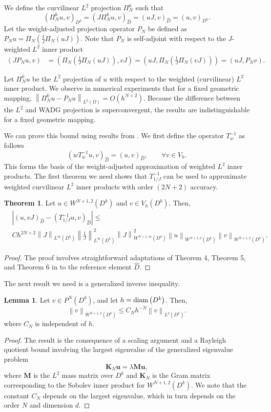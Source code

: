\documentclass[preprint,10pt]{article}
\theoremstyle{definition}
\theoremstyle{lemma}
\newtheorem{lemma}{Lemma}
\theoremstyle{theorem}
\newtheorem{theorem}{Theorem}
\theoremstyle{assumption}
\renewcommand{\hat}{\widehat}
\newcommand{\nor}[1]{\left\| #1 \right\|}
\newcommand{\LRp}[1]{\left( #1 \right)}
\newcommand{\LRb}[1]{\left| #1 \right|}
\begin{document}
We define the curvilinear $L^2$ projection $\Pi_N^k$ such that
\[
\LRp{\Pi_N^k u,v}_{D^k} = \LRp{J \Pi_N^k u,v}_{\hat{D}} = \LRp{uJ,v}_{\hat{D}} = \LRp{u,v}_{D^k}.  
\]
Let the weight-adjusted projection operator $P_N$ be defined as $P_N u = \Pi_N\LRp{\frac{1}{J}\Pi_N\LRp{uJ}}$.  Note that $P_N$ is self-adjoint with respect to the $J$-weighted $L^2$ inner product
\begin{align*}
\LRp{J P_N u, v} &= \LRp{\Pi_N\LRp{\frac{1}{J}\Pi_N\LRp{uJ}}, vJ} = \LRp{uJ, \Pi_N\LRp{\frac{1}{J}\Pi_N\LRp{vJ}}} =  \LRp{uJ, P_N v}.
\end{align*}

Let $\Pi_N^k u$ be the $L^2$ projection of $u$ with respect to the weighted (curvilinear) $L^2$ inner product.  We observe in numerical experiments that for a fixed geometric mapping, $\nor{\Pi_N^k u - P_N u}_{L^2\LRp{\Omega}} = O(h^{N+2})$.  Because the difference between the $L^2$ and WADG projection is superconvergent, the results are indistinguishable for a fixed geometric mapping.  

We can prove this bound using results from \cite{chan2016weight1}.  We first define the operator $T_{w}^{-1}$ as follows
\[
\LRp{wT_{w}^{-1} u,v}_{\hat{D}} = \LRp{ u,v}_{\hat{D}}, \qquad \forall v\in V_h.
\]
This forms the basis of the weight-adjusted approximation of weighted $L^2$ inner products.  The first theorem we need shows that $T_{1/J}^{-1}$ can be used to approximate weighted curvilinear $L^2$ inner products with order $(2N+2)$ accuracy.  
\begin{theorem}
\label{thm:moment}
Let $u\in W^{N+1,2}\LRp{D^k}$ and $v\in V_h\LRp{D^k}$.  Then, 
\begin{align*}
&\LRb{\LRp{u,vJ}_{\hat{D}} - \LRp{T^{-1}_{1/J}u,v}_{\hat{D}}} \leq \\
&Ch^{2N+2}\nor{J}_{L^{\infty}\LRp{D^k}}  \nor{\frac{1}{J}}_{L^{\infty}\LRp{D^k}}^2 \nor{J}^2_{W^{N+1,\infty}\LRp{D^k}}\nor{u}_{W^{N+1,2}\LRp{D^k}}\nor{v}_{W^{N+1,2}\LRp{D^k}}.
\end{align*}
\end{theorem}
\begin{proof}
The proof involves straightforward adaptations of Theorem 4, Theorem 5, and Theorem 6 in \cite{chan2016weight1} to the reference element $\hat{D}$.  
\end{proof}
The next result we need is a generalized inverse inequality.  
\begin{lemma}
\label{lemma:sobolev}
Let $v \in P^N\LRp{D^k}$, and let $h = {\rm diam}\LRp{D^k}$.  Then,
\[
\nor{v}_{W^{N+1,2}\LRp{D^k}} \leq C_{N} h^{-N} \nor{v}_{L^2\LRp{D^k}}.
\]
where $C_{N}$ is independent of $h$.
\end{lemma}
\begin{proof}
The result is the consequence of a scaling argument and a Rayleigh quotient bound involving the largest eigenvalue of the generalized eigenvalue problem  
\[
\bm{K}_N\bm{u} = \lambda\bm{M}\bm{u},
\]
where $\bm{M}$ is the $L^2$ mass matrix over $D^k$ and $\bm{K}_N$ is the Gram matrix corresponding to the Sobolev inner product for $W^{N+1,2}\LRp{D^k}$.  We note that the constant $C_N$ depends on the largest eigenvalue, which in turn depends on the order $N$ and dimension $d$.  
\end{proof}
\end{document}
